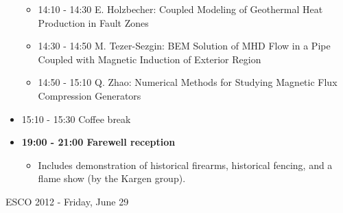 \documentclass[10pt, A4]{article}%
\begin{document}
\begin{itemize}
\begin{itemize}
    \item 14:10 - 14:30 E. Holzbecher: Coupled Modeling of Geothermal Heat Production in Fault Zones 
    \item 14:30 - 14:50 M. Tezer-Sezgin: BEM Solution of MHD Flow in a Pipe Coupled with Magnetic Induction of Exterior Region 
    \item 14:50 - 15:10 Q. Zhao: Numerical Methods for Studying Magnetic Flux Compression Generators 
  \end{itemize}
  \item 15:10 - 15:30 Coffee break
  \item {\bf 19:00 - 21:00 Farewell reception}
    \begin{itemize}
     \item Includes demonstration of historical firearms, historical fencing, and a flame show (by the Kargen group).
  \end{itemize} 
\end{itemize}

\newpage

\centerline{\huge ESCO 2012 - Friday, June 29}
\vspace{4mm}
\end{document}
